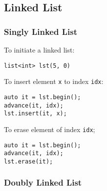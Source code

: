 \subsection{Linked List}
\subsubsection{Singly Linked List}
To initiate a linked list:
\begin{lstlisting}
list<int> lst(5, 0)
\end{lstlisting}
To insert element \texttt{x} to index \texttt{idx}:
\begin{lstlisting}
auto it = lst.begin();
advance(it, idx);
lst.insert(it, x);
\end{lstlisting}
To erase element of index \texttt{idx};
\begin{lstlisting}
auto it = lst.begin();
advance(it, idx);
lst.erase(it);
\end{lstlisting}
\subsubsection{Doubly Linked List}